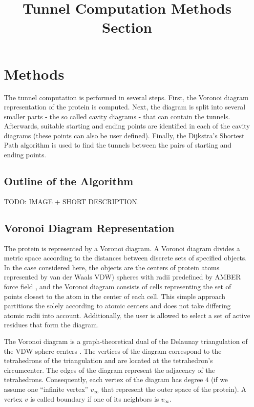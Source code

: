 \documentclass[11pt]{article} %
\title{Tunnel Computation Methods Section}
\author{}
\begin{document}
\maketitle

\section{Methods}

The tunnel computation is performed in several steps. First, the Voronoi diagram representation of the protein is computed. Next, the diagram is split into several smaller parts - the so called cavity diagrams - that can contain the tunnels. Afterwards, suitable starting and ending points are identified in each of the cavity diagrams (these points can also be user defined). Finally, the Dijkstra's Shortest Path algorithm is used to find the tunnels between the pairs of starting and ending points.

\subsection{Outline of the Algorithm}

TODO: IMAGE + SHORT DESCRIPTION.

\subsection{Voronoi Diagram Representation}
The protein is represented by a Voronoi diagram. A Voronoi diagram divides a metric space according to the distances between discrete sets of specified objects. In the case considered here, the objects are the centers of protein atoms represented by van der Waals VDW) spheres with radii predefined by AMBER force field \cite{c}, and the Voronoi diagram consists of cells representing the set of points closest to the atom in the center of each cell. This simple approach partitions the solely according to atomic centers and does not take differing atomic radii into account. Additionally, the user is allowed to select a set of active residues that form the diagram. 

The Voronoi diagram is a graph-theoretical dual of the Delaunay triangulation of the VDW sphere centers \cite{?}. The vertices of the diagram correspond to the tetrahedrons of the triangulation and are located at the tetrahedron's circumcenter. The edges of the diagram represent the adjacency of the tetrahedrons. Consequently, each vertex of the diagram has degree 4 (if we assume one ``infinite vertex'' $v_\infty$ that represent the outer space of the protein). A vertex $v$ is called boundary if one of its neighbors is $v_\infty$.
\end{document}

